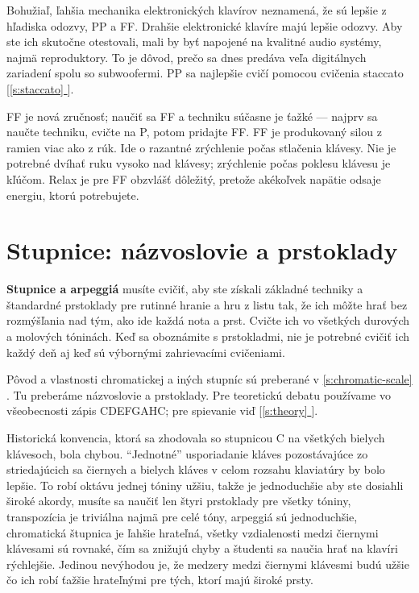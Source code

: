 \documentclass[11pt,a4paper]{book}
\newcommand*{\fullref}[1]{\hyperref[{#1}]{\ref*{#1} \nameref*{#1}}} %
\newcommand*{\fullrefp}[1]{[\fullref{#1}]} %
\begin{document}
Bohužiaľ, ľahšia mechanika elektronických klavírov neznamená, že sú lepšie z hľadiska odozvy, PP a FF. Drahšie elektronické klavíre majú lepšie odozvy. Aby ste ich skutočne otestovali, mali by byť napojené na kvalitné audio systémy, najmä reproduktory. To je dôvod, prečo sa dnes predáva veľa digitálnych zariadení spolu so subwoofermi. PP sa najlepšie cvičí pomocou cvičenia staccato \fullrefp{s:staccato}.

FF je nová zručnosť; naučiť sa FF a techniku súčasne je ťažké — najprv sa naučte techniku, cvičte na P, potom pridajte FF. FF je produkovaný silou z ramien viac ako z rúk. Ide o razantné zrýchlenie počas stlačenia klávesy. Nie je potrebné dvíhať ruku vysoko nad klávesy; zrýchlenie počas poklesu klávesu je kľúčom. Relax je pre FF obzvlášť dôležitý, pretože akékoľvek napätie odsaje energiu, ktorú potrebujete.


\section{Stupnice: názvoslovie a prstoklady}\label{s:scales}
\textbf{Stupnice a arpeggiá} musíte cvičiť, aby ste získali základné techniky a štandardné prstoklady pre rutinné hranie a hru z listu tak, že ich môžte hrať bez rozmýšľania nad tým, ako ide každá nota a prst. Cvičte ich vo všetkých durových a molových tóninách. Keď sa oboznámite s prstokladmi, nie je potrebné cvičiť ich každý deň aj keď sú výbornými zahrievacími cvičeniami.

Pôvod a vlastnosti chromatickej a iných stupníc sú preberané v \fullref{s:chromatic-scale}. Tu preberáme názvoslovie a prstoklady. Pre teoretickú debatu používame vo všeobecnosti zápis CDEFGAHC; pre spievanie viď \fullrefp{s:theory}.

Historická konvencia, ktorá sa zhodovala so stupnicou C na všetkých bielych klávesoch, bola chybou. “Jednotné” usporiadanie kláves pozostávajúce zo striedajúcich sa čiernych a bielych kláves v celom rozsahu klaviatúry by bolo lepšie. To robí oktávu jednej tóniny užšiu, takže je jednoduchšie aby ste dosiahli široké akordy, musíte sa naučiť len štyri prstoklady pre všetky tóniny, transpozícia je triviálna najmä pre celé tóny, arpeggiá sú jednoduchšie, chromatická štupnica je ľahšie hrateľná, všetky vzdialenosti medzi čiernymi klávesami sú rovnaké, čím sa znižujú chyby a študenti sa naučia hrať na klavíri rýchlejšie. Jedinou nevýhodou je, že medzery medzi čiernymi klávesmi budú užšie čo ich  robí ťažšie hrateľnými pre tých, ktorí majú široké prsty.
\end{document}
